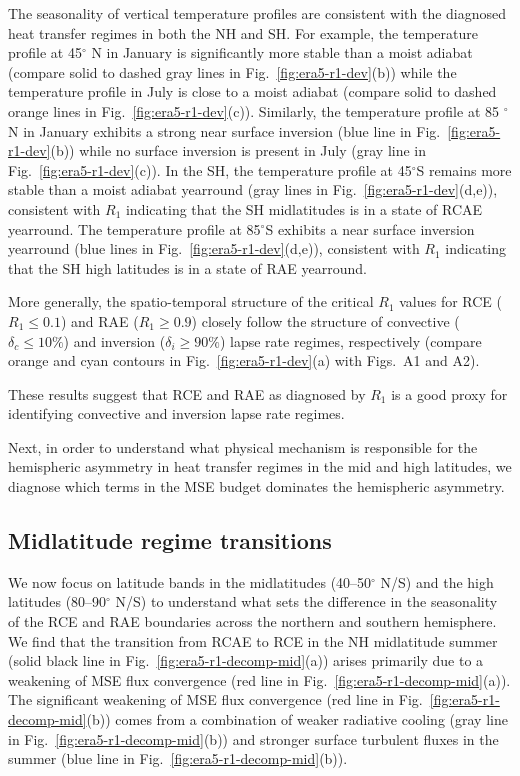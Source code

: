 \documentclass{ametsocV5}
\begin{document}
    The seasonality of vertical temperature profiles are consistent with the diagnosed heat transfer regimes in both the NH and SH. For example, the temperature profile at 45$^{\circ}$ N in January is significantly more stable than a moist adiabat (compare solid to dashed gray lines in Fig.~\ref{fig:era5-r1-dev}(b)) while the temperature profile in July is close to a moist adiabat (compare solid to dashed orange lines in Fig.~\ref{fig:era5-r1-dev}(c)). Similarly, the temperature profile at 85 $^{\circ}$ N in January exhibits a strong near surface inversion (blue line in Fig.~\ref{fig:era5-r1-dev}(b)) while no surface inversion is present in July (gray line in Fig.~\ref{fig:era5-r1-dev}(c)). In the SH, the temperature profile at 45$^{\circ}$S remains more stable than a moist adiabat yearround (gray lines in Fig.~\ref{fig:era5-r1-dev}(d,e)), consistent with $R_{1}$ indicating that the SH midlatitudes is in a state of RCAE yearround. The temperature profile at 85$^{\circ}$S exhibits a near surface inversion yearround (blue lines in Fig.~\ref{fig:era5-r1-dev}(d,e)), consistent with $R_{1}$ indicating that the SH high latitudes is in a state of RAE yearround.
    
    More generally, the spatio-temporal structure of the critical \(R_{1}\) values for RCE (\(R_{1}\le 0.1\)) and RAE (\(R_{1}\ge 0.9\)) closely follow the structure of convective (\(\delta_{c}\le 10\%\)) and inversion (\(\delta_{i}\ge 90\%\)) lapse rate regimes, respectively (compare orange and cyan contours in Fig.~\ref{fig:era5-r1-dev}(a) with Figs.~A1 and A2).
    
    These results suggest that RCE and RAE as diagnosed by \(R_{1}\) is a good proxy for identifying convective and inversion lapse rate regimes.
    
    Next, in order to understand what physical mechanism is responsible for the hemispheric asymmetry in heat transfer regimes in the mid and high latitudes, we diagnose which terms in the MSE budget dominates the hemispheric asymmetry.


\subsection{Midlatitude regime transitions} \label{subsec:asym}
    We now focus on latitude bands in the midlatitudes (40--50$^{\circ}$ N/S) and the high latitudes (80--90$^{\circ}$ N/S) to understand what sets the difference in the seasonality of the RCE and RAE boundaries across the northern and southern hemisphere. We find that the transition from RCAE to RCE in the NH midlatitude summer (solid black line in Fig.~\ref{fig:era5-r1-decomp-mid}(a)) arises primarily due to a weakening of MSE flux convergence (red line in Fig.~\ref{fig:era5-r1-decomp-mid}(a)). The significant weakening of MSE flux convergence (red line in Fig.~\ref{fig:era5-r1-decomp-mid}(b)) comes from a combination of weaker radiative cooling (gray line in Fig.~\ref{fig:era5-r1-decomp-mid}(b)) and stronger surface turbulent fluxes in the summer (blue line in Fig.~\ref{fig:era5-r1-decomp-mid}(b)).
    
\end{document}

